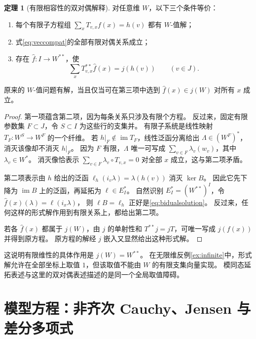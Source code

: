 \documentclass[UTF8,11pt,a4paper]{ctexart}
\theoremstyle{definition}
\newtheorem{theorem}{定理}[section]
\newcommand{\im}{\operatorname{im}}
\numberwithin{equation}{section}
\begin{document}
\begin{theorem}[有限相容性的双对偶解释]\label{thm:bidual}
对任意维 $W$，以下三个条件等价：
\begin{enumerate}
\item 每个有限子方程组 $\sum_xT_{v,x}f(x)=h(v)$ 都有 $W$-值解；
\item 式\eqref{eq:veccompat}的全部有限对偶关系成立；
\item 存在 $\widehat f:I\to W^{**}$，使
\begin{equation}\label{eq:bidualsolution}
 \sum_xT_{v,x}^{**}\widehat f(x)=j(h(v))\qquad(v\in J).
\end{equation}
\end{enumerate}
原来的 $W$-值问题有解，当且仅当可在第三项中选到 $\widehat f(x)\in j(W)$ 对所有 $x$ 成立。
\end{theorem}
\begin{proof}
第一项蕴含第二项，因为每条关系只涉及有限个方程。
反过来，固定有限参数集 $F\subset J$，令 $S\subset I$ 为这些行的支集并。
有限子系统是线性映射
$T_F:W^S\to W^F$ 的一个纤维。
若 $h|_F\notin\im T_F$，线性泛函分离给出 $\Lambda\in(W^F)^*$，消灭该像却不消灭 $h|_F$。
因为 $F$ 有限，$\Lambda$ 唯一可写成 $\sum_{v\in F}\lambda_v(w_v)$，其中 $\lambda_v\in W^*$。
消灭像恰表示 $\sum_{v\in F}\lambda_v\circ T_{v,x}=0$ 对全部 $x$ 成立，这与第二项矛盾。

第二项表示由 $h$ 给出的泛函 $\ell_h(i_v\lambda)=\lambda(h(v))$ 消灭 $\ker B$。
因此它先下降为 $\im B$ 上的泛函，再延拓为 $\ell\in E_I^*$。
自然识别 $E_I^*=(W^{**})^I$，令 $\widehat f(x)(\lambda)=\ell(i_x\lambda)$，
则 $\ell B=\ell_h$ 正好是\eqref{eq:bidualsolution}。
反过来，任何这样的形式解作用到有限关系上，都给出第二项。

若各 $\widehat f(x)$ 都属于 $j(W)$，由 $j$ 的单射性和 $T^{**}j=jT$，可唯一写成 $j(f(x))$ 并得到原方程。
原方程的解经 $j$ 嵌入又显然给出这种形式解。
\end{proof}

这说明有限维性的具体作用是 $j(W)=W^{**}$。
在无限维反例\ref{ex:infinite}中，形式解允许在全部坐标上取值 $1$，但该取值不能由 $W$ 的有限支集向量实现。
模同态延拓表述与这里的双对偶表述描述的是同一个全局取值障碍。

\section{模型方程：非齐次 Cauchy、Jensen 与差分多项式}\label{sec:models}
\end{document}
